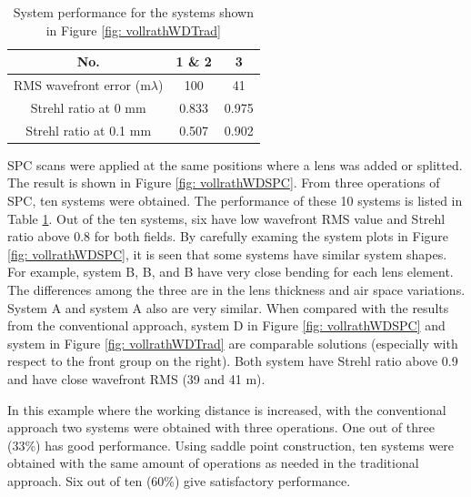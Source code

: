 \setlength{\arrayrulewidth}{.5mm}
\setlength{\tabcolsep}{18pt}
\renewcommand{\arraystretch}{1.2}
\begin{table}[h!]
    \centering
    \captionsetup{justification=centering}
    \caption{System performance for the systems shown in Figure \ref{fig: vollrathWDTrad}}
    \label{table: vollrathWDTrad}
    \vspace{-1em}
    \begin{adjustbox}{max width=\textwidth, center}
    \begin{tabular}{c c c}
    \hline 
     No. & \textbf{1 \& 2} & \textbf{3}  \\ 
     \midrule
    RMS wavefront error (m$\lambda$) & 100 & 41 \\ 
    Strehl ratio at 0 mm & 0.833 & 0.975 \\
    Strehl ratio at 0.1 mm & 0.507 & 0.902 \\
    \hline
    \end{tabular}
    \end{adjustbox}
\end{table}

SPC scans were applied at the same positions where a lens was added or splitted. The result is shown in Figure \ref{fig: vollrathWDSPC}. From three operations of SPC, ten systems were obtained. The performance of these 10 systems is listed in Table \ref{table: vollrathWDTrad}. Out of the ten systems, six have low wavefront RMS value and Strehl ratio above 0.8 for both fields. By carefully examing the system plots in Figure \ref{fig: vollrathWDSPC}, it is seen that some systems have similar system shapes. For example, system B, B, and B have very close bending for each lens element. The differences among the three are in the lens thickness and air space variations. System A and system A also are very similar. When compared with the results from the conventional approach, system D in Figure \ref{fig: vollrathWDSPC} and system  in Figure \ref{fig: vollrathWDTrad} are comparable solutions (especially with respect to the front group on the right). Both system have Strehl ratio above 0.9 and have close wavefront RMS (39 and 41 m\lambda).

In this example where the working distance is increased, with the conventional approach two systems were obtained with three operations. One out of three (33\%) has good performance. Using saddle point construction, ten systems were obtained with the same amount of operations as needed in the traditional approach. Six out of ten (60\%) give satisfactory performance. 

